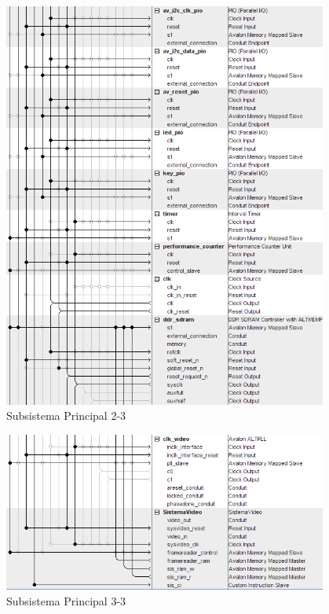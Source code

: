 \documentclass[a4paper,12pt,titlepage,final]{book}
\begin{document}
\begin{figure}[p]
\centering
\includegraphics[height=0.95\textheight,
width=0.95\textwidth]{./figuras/SistemaPrincipal/sistemaprincipalpagina2.png}
\caption{Subsistema Principal 2-3}
\label{fig:Subsistema Principal 2-3}
\end{figure}

\begin{figure}[p]
\centering
\includegraphics[height=0.5\textheight,
width=0.95\textwidth]{./figuras/SistemaPrincipal/sistemaprincipalpagina3.png}
\caption{Subsistema Principal 3-3}
\label{fig:Subsistema Principal 3-3}
\end{figure}
\end{document}

